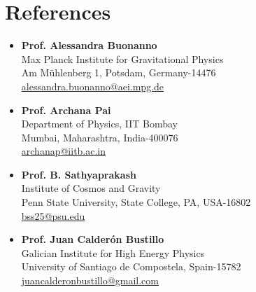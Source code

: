 \section{References}

\vspace{1em}

\begin{minipage}[t]{0.48\textwidth}
\begin{itemize}

\item \textbf{Prof. Alessandra Buonanno}\\
Max Planck Institute for Gravitational Physics\\
Am Mühlenberg 1, Potsdam, Germany-14476\\
\href{mailto:alessandra.buonanno@aei.mpg.de}{alessandra.buonanno@aei.mpg.de}

\vspace{1em}

\item \textbf{Prof. Archana Pai}\\
Department of Physics, IIT Bombay\\
Mumbai, Maharashtra, India-400076\\
\href{mailto:archanap@iitb.ac.in}{archanap@iitb.ac.in}

\end{itemize}
\end{minipage}
\hfill
\begin{minipage}[t]{0.48\textwidth}
\begin{itemize}

\item \textbf{Prof. B. Sathyaprakash}\\
Institute of Cosmos and Gravity\\
Penn State University, State College, PA, USA-16802\\
\href{mailto:bss25@psu.edu}{bss25@psu.edu}

\vspace{1em}

\item \textbf{Prof. Juan Calderón Bustillo}\\
Galician Institute for High Energy Physics\\
University of Santiago de Compostela, Spain-15782\\
\href{mailto:juancalderonbustillo@gmail.com}{juancalderonbustillo@gmail.com}

\end{itemize}
\end{minipage}